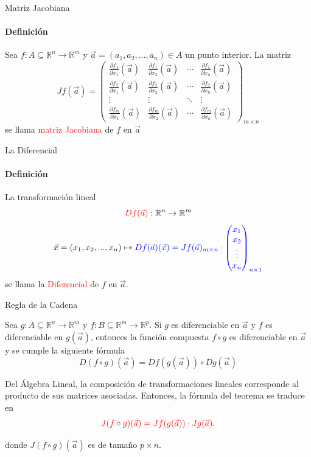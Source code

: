 \documentclass{plantillaPPT}
\begin{document}
\begin{frame}{Matriz Jacobiana}
\framesubtitle{Definición}

\begin{definicion}
Sea \(f:A\subseteq\mathbb{R}^n\to\mathbb{R}^m\) y \(\vec{a}=(a_1,a_2,...,a_n)\in A\) un punto interior. La matriz
    \[
    Jf(\vec{a})=
    \begin{pmatrix}
    \frac{\partial f_1}{\partial x_1}(\vec{a}) & \frac{\partial f_1}{\partial x_2}(\vec{a}) & \cdots & \frac{\partial f_1}{\partial x_n}(\vec{a}) \\
    \frac{\partial f_2}{\partial x_1}(\vec{a}) & \frac{\partial f_2}{\partial x_2}(\vec{a}) & \cdots & \frac{\partial f_2}{\partial x_n}(\vec{a}) \\
    \vdots & \vdots & \ddots & \vdots \\
    \frac{\partial f_m}{\partial x_1}(\vec{a}) & \frac{\partial f_m}{\partial x_2}(\vec{a}) & \cdots & \frac{\partial f_m}{\partial x_n}(\vec{a})
    \end{pmatrix}_{m\times n}
    \]
se llama \textcolor{red}{matriz Jacobiana} de \(f\) en \(\vec{a}\)
\end{definicion}
\end{frame}

\begin{frame}{La Diferencial}
\framesubtitle{Definición}

\begin{definicion}
    La transformación lineal
    \[
    \textcolor{red}{Df(\vec{a})}:\mathbb{R}^n\to\mathbb{R}^m
    \]
    \[
    \vec{x}=(x_1,x_2,...,x_n)\mapsto\textcolor{blue}{Df(\vec{a})(\vec{x})=Jf(\vec{a})_{m\times n}\cdot
    \begin{pmatrix}
        x_1\\x_2\\\vdots\\x_n
    \end{pmatrix}_{n\times 1}
    }
    \]
    se llama la \textcolor{red}{Diferencial} de \(f\) en \(\vec{a}\).
\end{definicion}
    
\end{frame}

\begin{frame}{Regla de la Cadena}
\vspace{-15pt}
\begin{teorema}
Sea \(g:A\subseteq\mathbb{R}^n\to\mathbb{R}^m\) y \(f:B\subseteq\mathbb{R}^m\to\mathbb{R}^p\). Si \(g\) es diferenciable en \(\vec{a}\) y \(f\) es diferenciable en \(g(\vec{a})\), entonces la función compuesta \(f\circ g\) es diferenciable en \(\vec{a}\) y se cumple la siguiente fórmula
\[
D(f\circ g)(\vec{a}) = Df(g(\vec{a}))\circ Dg(\vec{a})
\]

Del Álgebra Lineal, la composición de transformaciones lineales corresponde al producto de sus matrices asociadas. Entonces, la fórmula del teorema se traduce en
\[
\textcolor{red}{J(f\circ g)(\vec{a}) = Jf(g(\vec{a}))\cdot Jg(\vec{a})}.
\]

donde \(J(f\circ g)(\vec{a})\) es de tamaño \(p \times n\).
\end{teorema}
\end{frame}
\end{document}
